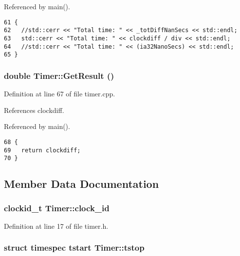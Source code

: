 Referenced by main().

\begin{Code}\begin{verbatim}61 {
62   //std::cerr << "Total time: " << _totDiffNanSecs << std::endl;
63   std::cerr << "Total time: " << clockdiff / div << std::endl;
64   //std::cerr << "Total time: " << (ia32NanoSecs) << std::endl;
65 }
\end{verbatim}
\end{Code}


\subsubsection{\setlength{\rightskip}{0pt plus 5cm}double Timer::GetResult ()}\label{classTimer_4db34f21ca587602a5496e34e061501f}




Definition at line 67 of file timer.cpp.

References clockdiff.

Referenced by main().

\begin{Code}\begin{verbatim}68 {
69   return clockdiff;
70 }
\end{verbatim}
\end{Code}




\subsection{Member Data Documentation}
\subsubsection{\setlength{\rightskip}{0pt plus 5cm}clockid\_\-t {\bf Timer::clock\_\-id}\hspace{0.3cm}{\tt  [private]}}\label{classTimer_6d6f0e6b1f075669a0b03cbaa5e26fa6}




Definition at line 17 of file timer.h.
\subsubsection{\setlength{\rightskip}{0pt plus 5cm}struct timespec tstart {\bf Timer::tstop}\hspace{0.3cm}{\tt  [read, private]}}\label{classTimer_bf54ab5847d8e97c930349d639a1cbee}




